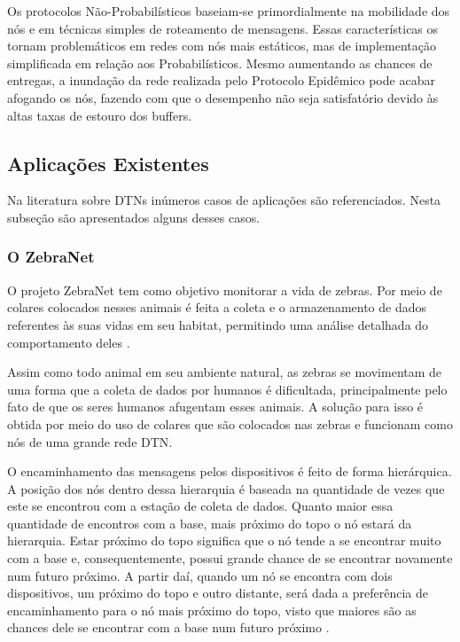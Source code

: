 Os protocolos Não-Probabilísticos baseiam-se primordialmente na mobilidade dos nós e em técnicas simples de roteamento de mensagens. Essas características os tornam problemáticos em redes com nós mais estáticos, mas de implementação simplificada em relação aos Probabilísticos. Mesmo aumentando as chances de entregas, a inundação da rede realizada pelo Protocolo Epidêmico pode acabar afogando os nós, fazendo com que o desempenho não seja satisfatório devido às altas taxas de estouro dos buffers.

\subsection{Aplicações Existentes}
\label{sec:aplicacoes}

Na literatura sobre DTNs inúmeros casos de aplicações são referenciados. Nesta subseção são apresentados alguns desses casos.

\subsubsection{O ZebraNet}

O projeto ZebraNet tem como objetivo monitorar a vida de zebras. Por meio de colares colocados nesses animais é feita a coleta e o armazenamento de dados referentes às suas vidas em seu habitat, permitindo uma análise detalhada do comportamento deles \cite{juang2002energy} \cite{zhang2004hardware}.

Assim como todo animal em seu ambiente natural, as zebras se movimentam de uma forma que a coleta de dados por humanos é dificultada, principalmente pelo fato de que os seres humanos afugentam esses animais. A solução para isso é obtida por meio do uso de colares que são colocados nas zebras e funcionam como nós de uma grande rede DTN. 

O encaminhamento das mensagens pelos dispositivos é feito de forma hierárquica. A posição dos nós dentro dessa hierarquia é baseada na quantidade de vezes que este se encontrou com a estação de coleta de dados. Quanto maior essa quantidade de encontros com a base, mais próximo do topo o nó estará da hierarquia. Estar próximo do topo significa que o nó tende a se encontrar muito com a base e, consequentemente, possui grande chance de se encontrar novamente num futuro próximo. A partir daí, quando um nó se encontra com dois dispositivos, um próximo do topo e outro distante, será dada a preferência de encaminhamento para o nó mais próximo do topo, visto que maiores são as chances dele se encontrar com a base num futuro próximo \cite{juang2002energy}.

